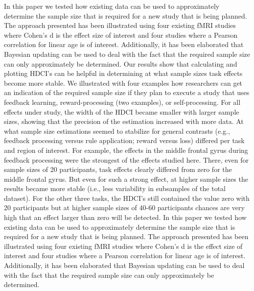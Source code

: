 \documentclass[
  letterpaper,
  DIV=11,
  numbers=noendperiod]{scrartcl}
\begin{document}
In this paper we tested how existing data can be used to approximately
determine the sample size that is required for a new study that is being
planned. The approach presented has been illustrated using four existing
fMRI studies where Cohen's d is the effect size of interest and four
studies where a Pearson correlation for linear age is of interest.
Additionally, it has been elaborated that Bayesian updating can be used
to deal with the fact that the required sample size can only
approximately be determined. Our results show that calculating and
plotting HDCI's can be helpful in determining at what sample sizes task
effects become more stable. We illustrated with four examples how
researchers can get an indication of the required sample size if they
plan to execute a study that uses feedback learning, reward-processing
(two examples), or self-processing. For all effects under study, the
width of the HDCI became smaller with larger sample sizes, showing that
the precision of the estimation increased with more data. At what sample
size estimations seemed to stabilize for general contrasts (e.g.,
feedback processing versus rule application; reward versus loss)
differed per task and region of interest. For example, the effects in
the middle frontal gyrus during feedback processing were the strongest
of the effects studied here. There, even for sample sizes of 20
participants, task effects clearly differed from zero for the middle
frontal gyrus. But even for such a strong effect, at higher sample sizes
the results became more stable (i.e., less variability in subsamples of
the total dataset). For the other three tasks, the HDCI's still
contained the value zero with 20 participants but at higher sample sizes
of 40-60 participants chances are very high that an effect larger than
zero will be detected. In this paper we tested how existing data can be
used to approximately determine the sample size that is required for a
new study that is being planned. The approach presented has been
illustrated using four existing fMRI studies where Cohen's d is the
effect size of interest and four studies where a Pearson correlation for
linear age is of interest. Additionally, it has been elaborated that
Bayesian updating can be used to deal with the fact that the required
sample size can only approximately be determined.
\end{document}
